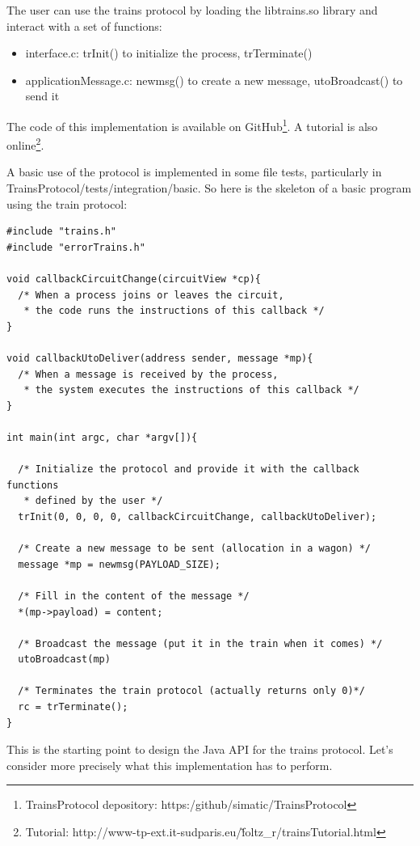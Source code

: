 \documentclass[a4paper,10pt]{report}
\begin{document}
The user can use the trains protocol by loading the libtrains.so library and interact with a set of functions:
\begin{itemize}
  \item interface.c: trInit() to initialize the process, trTerminate()
  \item applicationMessage.c: newmsg() to create a new message, utoBroadcast() to send it\\
\end{itemize}


The code of this implementation is available on GitHub\footnote{TrainsProtocol depository: https:/github/simatic/TrainsProtocol}.
A tutorial is also online\footnote{Tutorial: http://www-tp-ext.it-sudparis.eu/\~foltz\_r/trainsTutorial.html}.

A basic use of the protocol is implemented in some file tests, particularly in TrainsProtocol/tests/integration/basic.
So here is the skeleton of a basic program using the train protocol:\\

\lstset{language=C}
\lstset{commentstyle=\textit} 
\begin{lstlisting}
#include "trains.h"
#include "errorTrains.h"

void callbackCircuitChange(circuitView *cp){
  /* When a process joins or leaves the circuit, 
   * the code runs the instructions of this callback */
}

void callbackUtoDeliver(address sender, message *mp){
  /* When a message is received by the process,
   * the system executes the instructions of this callback */
}

int main(int argc, char *argv[]){
  
  /* Initialize the protocol and provide it with the callback functions
   * defined by the user */
  trInit(0, 0, 0, 0, callbackCircuitChange, callbackUtoDeliver);

  /* Create a new message to be sent (allocation in a wagon) */
  message *mp = newmsg(PAYLOAD_SIZE);

  /* Fill in the content of the message */
  *(mp->payload) = content;

  /* Broadcast the message (put it in the train when it comes) */
  utoBroadcast(mp)

  /* Terminates the train protocol (actually returns only 0)*/
  rc = trTerminate();
}
\end{lstlisting} 

This is the starting point to design the Java API for the trains protocol. Let's consider more precisely what this
implementation has to perform.
\end{document}
